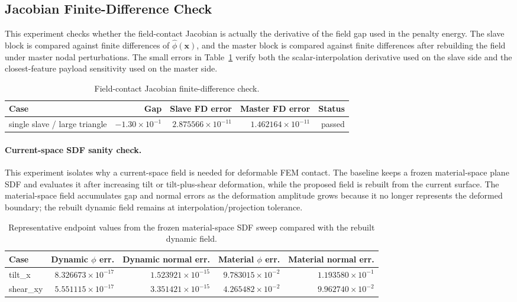 \documentclass[11pt]{article}
\begin{document}
\subsection{Jacobian Finite-Difference Check}

This experiment checks whether the field-contact Jacobian is actually the derivative of the field gap used in the penalty energy. The slave block is compared against finite differences of \(\hat{\phi}(\mathbf{x})\), and the master block is compared against finite differences after rebuilding the field under master nodal perturbations. The small errors in Table~\ref{tab:field-jacobian} verify both the scalar-interpolation derivative used on the slave side and the closest-feature payload sensitivity used on the master side.

\begin{table}[t]
\centering
\small
\caption{Field-contact Jacobian finite-difference check.}
\label{tab:field-jacobian}
\begin{tabular}{lrrrr}
\toprule
Case & Gap & Slave FD error & Master FD error & Status \\
\midrule
single slave / large triangle & \(-1.30\times10^{-1}\) & \(2.875566\times10^{-11}\) & \(1.462164\times10^{-11}\) & passed \\
\bottomrule
\end{tabular}
\end{table}

\paragraph{Current-space SDF sanity check.}

This experiment isolates why a current-space field is needed for deformable FEM contact. The baseline keeps a frozen material-space plane SDF and evaluates it after increasing tilt or tilt-plus-shear deformation, while the proposed field is rebuilt from the current surface. The material-space field accumulates gap and normal errors as the deformation amplitude grows because it no longer represents the deformed boundary; the rebuilt dynamic field remains at interpolation/projection tolerance.

\begin{table}[t]
\centering
\small
\caption{Representative endpoint values from the frozen material-space SDF sweep compared with the rebuilt dynamic field.}
\label{tab:material-baseline}
\begin{tabular}{lrrrr}
\toprule
Case & Dynamic \(\phi\) err. & Dynamic normal err. & Material \(\phi\) err. & Material normal err. \\
\midrule
tilt\_x & \(8.326673\times10^{-17}\) & \(1.523921\times10^{-15}\) & \(9.783015\times10^{-2}\) & \(1.193580\times10^{-1}\) \\
shear\_xy & \(5.551115\times10^{-17}\) & \(3.351421\times10^{-15}\) & \(4.265482\times10^{-2}\) & \(9.962740\times10^{-2}\) \\
\bottomrule
\end{tabular}
\end{table}
\end{document}
